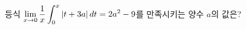 등식 $\displaystyle\lim_{x\to 0}\dfrac{1}{x}\displaystyle\int_{0}^{x} |t+3a|\mkern3mu dt=2a^2-9$를 만족시키는 양수 $a$의 값은?
